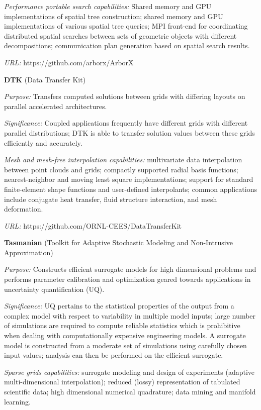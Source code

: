 {\it Performance portable search capabilities:} Shared memory and GPU
implementations of spatial tree construction; shared memory and GPU
implementations of various spatial tree queries; MPI front-end for
coordinating distributed spatial searches between sets of geometric objects
with different decompositions; communication plan generation based on spatial
search results.

{\it URL:} https://github.com/arborx/ArborX

{\bf DTK} (Data Transfer Kit)

{\it Purpose:} Transfers computed solutions between grids with differing
layouts on parallel accelerated architectures.

{\it Significance:} Coupled applications frequently have different grids with
different parallel distributions; DTK is able to transfer solution values
between these grids efficiently and accurately.

{\it Mesh and mesh-free interpolation capabilities:} multivariate data
interpolation between point clouds and grids; compactly supported radial basis
functions; nearest-neighbor and moving least square implementations; support
for standard finite-element shape functions and user-defined interpolants;
common applications include conjugate heat transfer, fluid structure
interaction, and mesh deformation.

{\it URL:} https://github.com/ORNL-CEES/DataTransferKit


{\bf Tasmanian} (Toolkit for Adaptive Stochastic Modeling and Non-Intrusive
Approximation)

{\it Purpose:} Constructs efficient surrogate models for high dimensional
problems and performs parameter calibration and optimization geared towards
applications in uncertainty quantification (UQ).

{\it Significance:} UQ pertains to the statistical properties of the output
from a complex model with respect to variability in multiple model inputs;
large number of simulations are required to compute reliable statistics which
is prohibitive when dealing with computationally expensive engineering
models. A surrogate model is constructed from a moderate set of simulations
using carefully chosen input values; analysis can then be performed on the
efficient surrogate.

{\it Sparse grids capabilities:} surrogate modeling and design of experiments
(adaptive multi-dimensional interpolation); reduced (lossy) representation of
tabulated scientific data; high dimensional numerical quadrature; data mining
and manifold learning.

